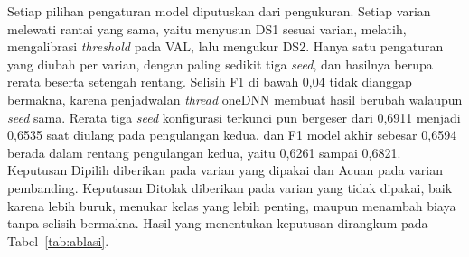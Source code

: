 Setiap pilihan pengaturan model diputuskan dari pengukuran. Setiap varian melewati rantai yang sama, yaitu menyusun DS1 sesuai varian, melatih, mengalibrasi \textit{threshold} pada VAL, lalu mengukur DS2. Hanya satu pengaturan yang diubah per varian, dengan paling sedikit tiga \textit{seed}, dan hasilnya berupa rerata beserta setengah rentang. Selisih F1 di bawah 0,04 tidak dianggap bermakna, karena penjadwalan \textit{thread} oneDNN membuat hasil berubah walaupun \textit{seed} sama. Rerata tiga \textit{seed} konfigurasi terkunci pun bergeser dari 0,6911 menjadi 0,6535 saat diulang pada pengulangan kedua, dan F1 model akhir sebesar 0,6594 berada dalam rentang pengulangan kedua, yaitu 0,6261 sampai 0,6821. Keputusan Dipilih diberikan pada varian yang dipakai dan Acuan pada varian pembanding. Keputusan Ditolak diberikan pada varian yang tidak dipakai, baik karena lebih buruk, menukar kelas yang lebih penting, maupun menambah biaya tanpa selisih bermakna. Hasil yang menentukan keputusan dirangkum pada Tabel~\ref{tab:ablasi}.

